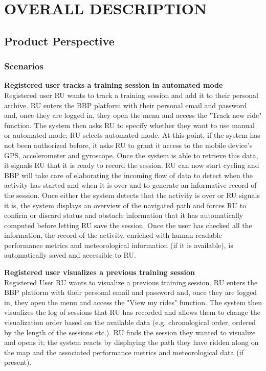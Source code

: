 \documentclass{article}
\begin{document}
\section{OVERALL DESCRIPTION}

\subsection{Product Perspective}
\subsubsection{Scenarios}

\textbf{Registered user tracks a training session in automated mode} \\
Registered user RU wants to track a training session and add it to their personal archive. RU enters the BBP platform with their personal email and password and, once they are logged in, they open the menu and access the "Track new ride" function. The system then asks RU to specify whether they want to use manual or automated mode; RU selects automated mode. At this point, if the system has not been authorized before, it asks RU to grant it access to the mobile device's GPS, accelerometer and gyroscope. Once the system is able to retrieve this data, it signals RU that it is ready to record the session. RU can now start cycling and BBP will take care of elaborating the incoming flow of data to detect when the activity has started and when it is over and to generate an informative record of the session. Once either the system detects that the activity is over or RU signals it is, the system displays an overview of the navigated path and forces RU to confirm or discard status and obstacle information that it has automatically computed before letting RU save the session. Once the user has checked all the information, the record of the activity, enriched with human readable performance metrics and meteorological information (if it is available), is automatically saved and accessible to RU.

\vspace{0.5cm}
\noindent
\textbf{Registered user visualizes a previous training session} \\
Registered User RU wants to visualize a previous training session. RU enters the BBP platform with their personal email and password and, once they are logged in, they open the menu and access the "View my rides" function. The system then visualizes the log of sessions that RU has recorded and allows them to change the visualization order based on the available data (e.g. chronological order, ordered by the length of the sessions etc.). RU finds the session they wanted to visualize and opens it; the system reacts by displaying the path they have ridden along on the map and the associated performance metrics and meteorological data (if present).
\end{document}
